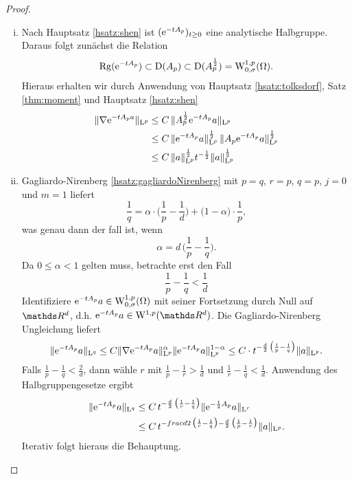 \begin{proof}
  \begin{enumerate}[i)]
    \item Nach Hauptsatz \ref{hsatz:shen} ist $(\mathrm{e}^{-tA_p})_{t \geq 0}$ eine analytische Halbgruppe.
      Daraus folgt zunächst die Relation
      $$
      \operatorname{Rg}(\mathrm{e}^{-tA_p}) \subset \mathrm{D}(A_p) \subset \mathrm{D}(A_p^{\frac{1}{2}}) = \mathrm{W}_{0,\sigma}^{1,p}(\Omega).
      $$
      Hieraus erhalten wir durch Anwendung von Hauptsatz \ref{hsatz:tolksdorf}, Satz \ref{thm:moment} und Hauptsatz \ref{hsatz:shen}
      \begin{align*}
        \|\nabla \mathrm{e}^{-t A_p a}\|_{\mathrm{L}^p}
        &\leq C \, \|A_p^{\frac{1}{2}} \mathrm{e}^{-t A_p} a\|_{\mathrm{L}^p} \\
        &\leq C\, \|\mathrm{e}^{-tA_p} a \|_{\mathrm{L}^p}^{\frac{1}{2}} \, \|A_p \mathrm{e}^{-t A_p} a\|_{\mathrm{L}^p}^{\frac{1}{2}} \\
        &\leq C\, \|a\|_{\mathrm{L}^p}^{\frac{1}{2}} t^{-\frac{1}{2}} \|a\|_{\mathrm{L}^p}^{\frac{1}{2}} 
      \end{align*}

    \item Gagliardo-Nirenberg \ref{hsatz:gagliardoNirenberg} mit $p = q$, $r = p$, $q = p$, $j = 0$ und $m = 1$ liefert
      $$
      \frac{1}{q} = \alpha\cdot \big(\frac{1}{p} - \frac{1}{d}\big) + \big(1 - \alpha \big) \cdot \frac{1}{p},
      $$
      was genau dann der fall ist, wenn
      $$
      \alpha = d \, \big( \frac{1}{p} - \frac{1}{q} \big).
      $$
      Da $0 \leq \alpha < 1$ gelten muss, betrachte erst den Fall
      $$
      \frac{1}{p} - \frac{1}{q} < \frac{1}{d}
      $$
      Identifiziere $\mathrm{e}^{-tA_p} a \in \mathrm{W}_{0,\sigma}^{1,p}(\Omega)$ mit seiner Fortsetzung durch Null auf $\R^d$, d.h. $\e^{-t A_p} a \in \WW^{1,p}(\R^d)$.
      Die Gagliardo-Nirenberg Ungleichung liefert
      $$
      \|\mathrm{e}^{-t A_p} a \|_{\mathrm{L}^q} \leq C \| \nabla \mathrm{e}^{-t A_p} a \|_{\mathrm{L}^p}^\alpha \|\mathrm{e}^{-t A_p} a \|_{\mathrm{L}^p}^{1 - \alpha}
      \leq C \cdot t^{-\frac{d}{2} \, \big( \frac{1}{p} - \frac{1}{q} \big)} \|a\|_{\mathrm{L}^p}.
      $$
      Falls $\frac{1}{p} - \frac{1}{q} < \frac{2}{d}$, dann wähle $r$ mit $\frac{1}{p} - \frac{1}{r} > \frac{1}{d}$ und $\frac{1}{r} - \frac{1}{q} < \frac{1}{d}$.
      Anwendung des Halbgruppengesetze ergibt
      \begin{align*}
        \|\mathrm{e}^{-tA_p} a\|_{\mathrm{L}^q} 
        &\leq C \, t^{-\frac{d}{2} \, \big( \frac{1}{r} - \frac{1}{q} \big)} \|\mathrm{e}^{-\frac{t}{2} A_p} a \|_{\mathrm{L}^r}  \\
        &\leq C\, t^{-frac{d}{2} \, \big( \frac{1}{r} - \frac{1}{q} \big) - \frac{d}{2} \, \big( \frac{1}{p} - \frac{1}{r} \big)} \|a\|_{\mathrm{L}^p}.
      \end{align*}
      Iterativ folgt hieraus die Behauptung.
  \end{enumerate}
\end{proof}
